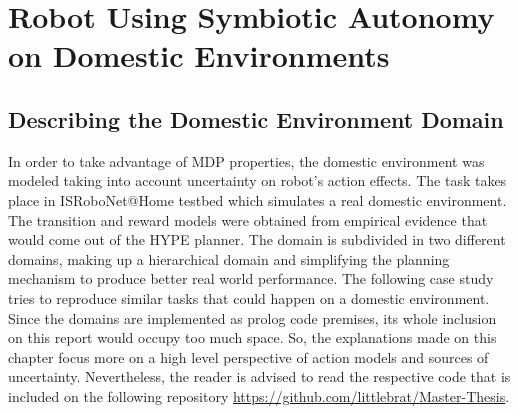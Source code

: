 
\chapter{Robot Using Symbiotic Autonomy on Domestic Environments}
\label{chapter:implementation}

\section{Describing the Domestic Environment Domain}

In order to take advantage of \gls{MDP} properties, the
domestic environment was modeled taking into account uncertainty on robot's
action effects. The task takes place in ISRoboNet@Home testbed which simulates a
real domestic environment. The transition and reward models were obtained from
empirical evidence that would come out of the \gls{HYPE} planner.
The domain is subdivided in two different domains, making up a hierarchical
domain and simplifying the planning mechanism to produce better real world
performance.
The following case study tries to reproduce similar tasks that could happen on
a domestic environment. Since the domains
are implemented as prolog code premises, its whole inclusion on this report would
occupy too much space. So, the explanations made on this chapter focus more on
a high level perspective of action models and sources of uncertainty.
Nevertheless, the reader is advised to read the respective code that is included
on the following repository \url{https://github.com/littlebrat/Master-Thesis}.

